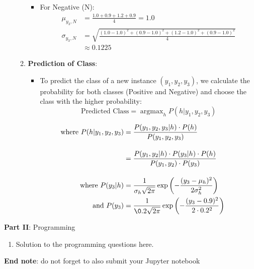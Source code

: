 \documentclass{article}
\DeclareMathOperator*{\argmax}{argmax}
\begin{document}
\begin{enumerate}[leftmargin=\labelsep]
\begin{enumerate}
\begin{itemize}
        \item For Negative (N):
        \begin{align*}
            \mu_{y_3,N} &= \frac{1.0 + 0.9 + 1.2 + 0.9}{4} = 1.0 \\
            \sigma_{y_3,N} &= \sqrt{\frac{(1.0 - 1.0)^2 + (0.9 - 1.0)^2 + (1.2 - 1.0)^2 + (0.9 - 1.0)^2}{4}} \\
                          &\approx 0.1225
        \end{align*}

    \end{itemize}

    \item \textbf{Prediction of Class}:
    \begin{itemize}
        \item To predict the class of a new instance \((y_1, y_2, y_3)\), we calculate the probability for both classes (Positive and Negative) and choose the class with the higher probability:
        \[
        \text{Predicted Class} = \argmax_h P(h | y_1, y_2, y_3)
        \]
    \end{itemize}
    
    \begin{align*}
    \text{where } P(h | y_1, y_2, y_3) &= \frac{P(y_1, y_2, y_3 | h) \cdot P(h)}{P(y_1, y_2, y_3)} \\[10pt]
    &= \frac{P(y_1, y_2 | h) \cdot P(y_3 | h) \cdot P(h)}{P(y_1, y_2) \cdot P(y_3)} \\[10pt]
    \text{where } P(y_3 | h) &= \frac{1}{\sigma_h \sqrt{2\pi}} \exp\left(-\frac{(y_3 - \mu_h)^2}{2\sigma_h^2}\right) \\
    \text{and } P(y_3) &= \frac{1}{\0.2 \sqrt{2\pi}} \exp\left(-\frac{(y_3 - 0.9)^2}{2 \cdot 0.2^2}\right)
    \end{align*}

\end{enumerate}


\end{enumerate}

\large{\textbf{Part II}: Programming}\normalsize

\begin{enumerate}[leftmargin=\labelsep,resume]
\item Solution to the programming questions here.
\end{enumerate}

\vskip 1cm
\textbf{End note}: do not forget to also submit your Jupyter notebook

\newpage

\end{document}
